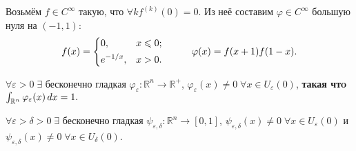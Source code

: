Возьмём $f \in C^\infty$ такую, что $\forall k f^{(k)} (0) = 0$. Из неё составим $\varphi\in C^\infty$ большую нуля на $(-1,1)$:
\begin{equation*}
	f(x) = \left\{
	\begin{aligned}
	    &0, &x\leq 0; \\
	    &e^{-1/x}, &x>0.
	\end{aligned}\right.
	\hspace*{1 cm} \varphi(x) = f(x+1) f(1-x).
\end{equation*}

\begin{to_lem}
	$\forall \varepsilon > 0 \; \exists$ бесконечно гладкая $\varphi_\varepsilon \colon \mathbb{R}^n \rightarrow \mathbb{R}^+$, $\varphi_\varepsilon(x) \neq 0 \; \forall x \in U_\varepsilon(0)$, \textbf{такая чтo} $\int_{\mathbb{R}^n} \varphi_\varepsilon(x) \d x = 1. $
	\label{lem_6.20}
\end{to_lem}

\begin{to_lem}
	$\forall \varepsilon > \delta > 0 \; \exists$
	бесконечно гладкая $\psi_{\varepsilon,\delta} \colon \mathbb{R}^n \rightarrow [0,1] $,
	$\psi_{\varepsilon,\delta}(x) \neq 0 \; \forall x \in U_\varepsilon(0)$ 
	и $\psi_{\varepsilon,\delta} (x) \neq 0 \; \forall x \in U_\delta(0)$.
\end{to_lem}